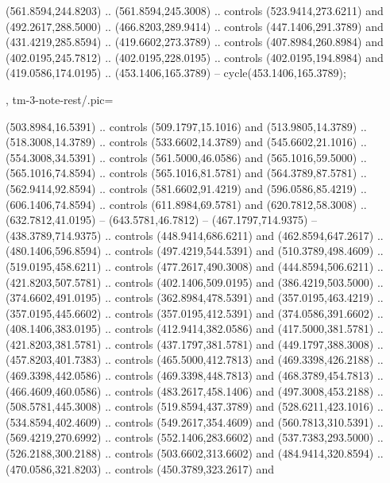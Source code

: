 {{\begin{scope}[y=-0.80pt,x=0.80pt,scale=0.038,xshift=-370pt,yshift=255pt]
        (561.8594,244.8203) .. (561.8594,245.3008) .. controls (523.9414,273.6211) and
        (492.2617,288.5000) .. (466.8203,289.9414) .. controls (447.1406,291.3789) and
        (431.4219,285.8594) .. (419.6602,273.3789) .. controls (407.8984,260.8984) and
        (402.0195,245.7812) .. (402.0195,228.0195) .. controls (402.0195,194.8984) and
        (419.0586,174.0195) .. (453.1406,165.3789) -- cycle(453.1406,165.3789); 
    \end{scope}
  },
  tm-3-note-rest/.pic={
    \begin{scope}[y=-0.80pt,x=0.80pt,scale=0.038,xshift=-390pt,yshift=280pt]
       (503.8984,16.5391) .. controls (509.1797,15.1016)
        and (513.9805,14.3789) .. (518.3008,14.3789) .. controls (533.6602,14.3789)
        and (545.6602,21.1016) .. (554.3008,34.5391) .. controls (561.5000,46.0586)
        and (565.1016,59.5000) .. (565.1016,74.8594) .. controls (565.1016,81.5781)
        and (564.3789,87.5781) .. (562.9414,92.8594) .. controls (581.6602,91.4219)
        and (596.0586,85.4219) .. (606.1406,74.8594) .. controls (611.8984,69.5781)
        and (620.7812,58.3008) .. (632.7812,41.0195) -- (643.5781,46.7812) --
        (467.1797,714.9375) -- (438.3789,714.9375) .. controls (448.9414,686.6211) and
        (462.8594,647.2617) .. (480.1406,596.8594) .. controls (497.4219,544.5391) and
        (510.3789,498.4609) .. (519.0195,458.6211) .. controls (477.2617,490.3008) and
        (444.8594,506.6211) .. (421.8203,507.5781) .. controls (402.1406,509.0195) and
        (386.4219,503.5000) .. (374.6602,491.0195) .. controls (362.8984,478.5391) and
        (357.0195,463.4219) .. (357.0195,445.6602) .. controls (357.0195,412.5391) and
        (374.0586,391.6602) .. (408.1406,383.0195) .. controls (412.9414,382.0586) and
        (417.5000,381.5781) .. (421.8203,381.5781) .. controls (437.1797,381.5781) and
        (449.1797,388.3008) .. (457.8203,401.7383) .. controls (465.5000,412.7813) and
        (469.3398,426.2188) .. (469.3398,442.0586) .. controls (469.3398,448.7813) and
        (468.3789,454.7813) .. (466.4609,460.0586) .. controls (483.2617,458.1406) and
        (497.3008,453.2188) .. (508.5781,445.3008) .. controls (519.8594,437.3789) and
        (528.6211,423.1016) .. (534.8594,402.4609) .. controls (549.2617,354.4609) and
        (560.7813,310.5391) .. (569.4219,270.6992) .. controls (552.1406,283.6602) and
        (537.7383,293.5000) .. (526.2188,300.2188) .. controls (503.6602,313.6602) and
        (484.9414,320.8594) .. (470.0586,321.8203) .. controls (450.3789,323.2617) and

\end{scope}}}
